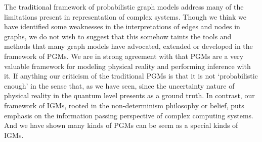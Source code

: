 \documentclass{article}
\theoremstyle{definition}
\theoremstyle{remark}
\theoremstyle{definition}
\begin{document}
\begin{CJK*}{UTF8}{gbsn}

The traditional framework of probabilistic graph models address many of the limitations present in representation of complex systems. Though we think we have identified some weaknesses in the interpretations of edges and nodes in graphs, we do not wish to suggest that this somehow taints the tools and methods that many graph models have advocated, extended or developed in the framework of PGMs. We are in strong agreement with that PGMs are a very valuable framework for modeling physical reality and performing inference with it. If anything our criticism of the traditional PGMs is that it is not ‘probabilistic enough’ in the sense that, as we have seen, since the uncertainty nature of physical reality in the quantum level presents as a ground truth. In contrast, our framework of IGMs, rooted in the non-determinism philosophy or belief, puts emphasis on the information passing perspective of complex computing systems. And we have shown many kinds of PGMs can be seem as a special kinds of IGMs.




{\small


}

\end{CJK*}
\end{document}
